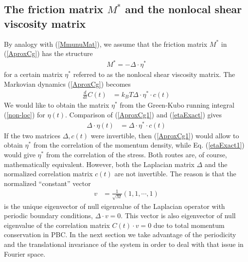 \documentclass[b5paper,openright,11pt]{book}
\newcommand{\esc}{\!\cdot\!}
\begin{document}
\subsection{The  friction   matrix  $M^*$  and  the   nonlocal  shear
  viscosity matrix}
By analogy with  (\ref{MmunuMat}), we assume that the  friction matrix $M^*$ in
(\ref{AproxCg}) has the structure
\begin{align}
  M^*=-\Delta\esc \eta^*
\end{align}
for a  certain  matrix  $\eta^*$  referred to  as  the  nonlocal  shear
viscosity  matrix.  The Markovian  dynamics  (\ref{AproxCg})
becomes
\begin{align}
\frac{d}{dt}C(t)&=  k_BT\Delta\esc \eta^*\esc c(t)
\label{AproxCg1}
\end{align}
We  would like  to  obtain  the matrix  $\eta^*$  from the  Green-Kubo
running  integral   (\ref{non-loc})  for  $\eta(t)$.    Comparison  of
(\ref{AproxCg1}) and (\ref{etaExact}) gives
\begin{align}
 \Delta\esc \eta(t) &=\Delta\esc \eta^*\esc c(t)
\label{etaExact1}
\end{align}
If   the   two   matrices    $\Delta,c(t)$   were   invertible,   then
(\ref{AproxCg1}) would  allow to obtain $\eta^*$  from the correlation
of  the  momentum  density,  while Eq.  (\ref{etaExact1})  would  give
$\eta^*$  from the  correlation of  the  stress. Both  routes are,  of
course, mathematically equivalent.  However, both the Laplacian matrix
$\Delta$  and  the  normalized   correlation  matrix  $c(t)$  are  not
invertible.  The reason is that the normalized ``constant'' vector
\begin{align}
  v&=\frac{1}{\sqrt{M}}(1,1,\cdots,1)
\end{align}
is the unique eigenvector of null eigenvalue of the Laplacian operator
with periodic boundary conditions, $\Delta  \cdot v=0$. This vector is
also  eigenvector  of  null   eigenvalue  of  the  correlation  matrix
$C(t)\esc v=0$  due to total momentum  conservation in PBC. 
In the next section we take advantage of the periodicity and the translational invariance of the system in order to deal with that issue in Fourier space. 
\end{document}
